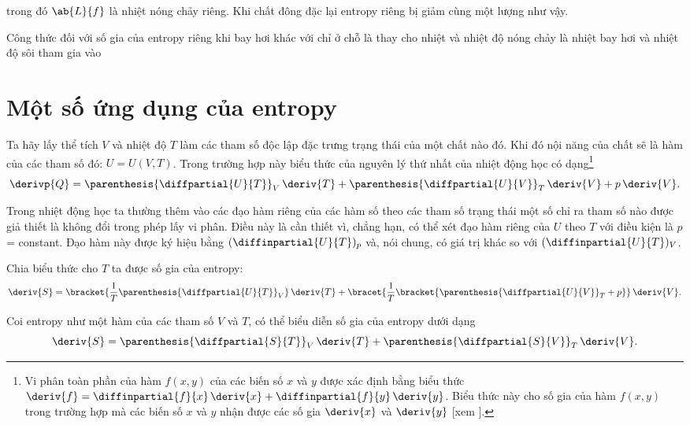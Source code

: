 \noindent
trong đó $\ab{L}{f}$ là nhiệt nóng chảy riêng. Khi chất đông đặc lại entropy riêng bị giảm cùng một lượng như vậy.

Công thức đối với số gia của entropy riêng khi bay hơi khác với  chỉ ở chỗ là thay cho nhiệt và nhiệt độ nóng chảy là nhiệt bay hơi và nhiệt độ sôi tham gia vào 

\section{Một số ứng dụng của entropy}\label{sec:12_5}

Ta hãy lấy thể tích $V$ và nhiệt độ $T$ làm các tham số độc lập đặc trưng trạng thái của một chất nào đó. Khi đó nội năng của chất sẽ là hàm của các tham số đó: $U=U(V, T)$. Trong trường hợp này biểu thức của nguyên lý thứ nhất của nhiệt động học có dạng\footnote{Vi phân toàn phần của hàm $f(x,y)$ của các biến số $x$ và $y$ được xác định bằng biểu thức $\deriv{f}=\diffinpartial{f}{x}\,\deriv{x}+\diffinpartial{f}{y}\,\deriv{y}$. Biểu thức này cho số gia của hàm $f(x,y)$ trong trường hợp mà các biến số $x$ và $y$ nhận được các số gia $\deriv{x}$ và $\deriv{y}$ [xem ].}
\begin{equation}\label{eq:12_41}
	\derivp{Q} = \parenthesis{\diffpartial{U}{T}}_V\,\deriv{T} + \parenthesis{\diffpartial{U}{V}}_T\,\deriv{V} + p\,\deriv{V}.
\end{equation}

\noindent
Trong nhiệt động học ta thường thêm vào các đạo hàm riêng của các hàm số theo các tham số trạng thái một số chỉ ra tham số nào được giả thiết là không đổi trong phép lấy vi phân. Điều này là cần thiết vì, chẳng hạn, có thể xét đạo hàm riêng của $U$ theo $T$ với điều kiện là $p$ = constant. Đạo hàm này được ký hiệu bằng $(\diffinpartial{U}{T})_p$ và, nói chung, có giá trị khác so với $(\diffinpartial{U}{T})_V$.

Chia biểu thức  cho $T$ ta được số gia của entropy:
\begin{equation}\label{eq:12_42}
	\deriv{S} = \bracket{\frac{1}{T} \parenthesis{\diffpartial{U}{T}}_V} \, \deriv{T} + \bracet{\frac{1}{T} \bracket{\parenthesis{\diffpartial{U}{V}}_T + p}}\,\deriv{V}.
\end{equation}

\noindent
Coi entropy như một hàm của các tham số $V$ và $T$, có thể biểu diễn số gia của entropy dưới dạng
\begin{equation*}
	\deriv{S} = \parenthesis{\diffpartial{S}{T}}_V\,\deriv{T} + \parenthesis{\diffpartial{S}{V}}_T\,\deriv{V}.
\end{equation*}

